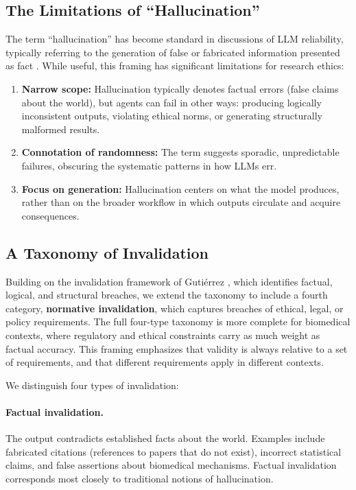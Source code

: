 \documentclass[11pt,letterpaper]{article}
\begin{document}
\subsection{The Limitations of ``Hallucination''}

The term ``hallucination'' has become standard in discussions of LLM reliability, typically referring to the generation of false or fabricated information presented as fact \cite{ji2023survey,huang2023survey,rawte2023survey}. While useful, this framing has significant limitations for research ethics:

\begin{enumerate}[leftmargin=*]
    \item \textbf{Narrow scope:} Hallucination typically denotes factual errors (false claims about the world), but agents can fail in other ways: producing logically inconsistent outputs, violating ethical norms, or generating structurally malformed results.
    
    \item \textbf{Connotation of randomness:} The term suggests sporadic, unpredictable failures, obscuring the systematic patterns in how LLMs err.
    
    \item \textbf{Focus on generation:} Hallucination centers on what the model produces, rather than on the broader workflow in which outputs circulate and acquire consequences.
\end{enumerate}

\subsection{A Taxonomy of Invalidation}

Building on the invalidation framework of Guti\'errez \cite{gutierrez2025}, which identifies factual, logical, and structural breaches, we extend the taxonomy to include a fourth category, \textbf{normative invalidation}, which captures breaches of ethical, legal, or policy requirements. The full four-type taxonomy is more complete for biomedical contexts, where regulatory and ethical constraints carry as much weight as factual accuracy. This framing emphasizes that validity is always relative to a set of requirements, and that different requirements apply in different contexts.

We distinguish four types of invalidation:

\paragraph{Factual invalidation.} The output contradicts established facts about the world. Examples include fabricated citations (references to papers that do not exist), incorrect statistical claims, and false assertions about biomedical mechanisms. Factual invalidation corresponds most closely to traditional notions of hallucination.
\end{document}

